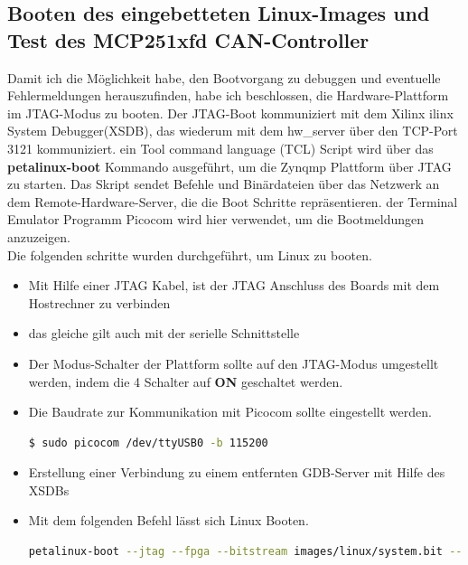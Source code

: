 \subsection{Booten des eingebetteten Linux-Images und Test des MCP251xfd CAN-Controller}
Damit ich die Möglichkeit habe, den Bootvorgang zu debuggen und eventuelle Fehlermeldungen herauszufinden, habe ich beschlossen, die Hardware-Plattform im JTAG-Modus zu booten. Der JTAG-Boot kommuniziert mit dem Xilinx ilinx System Debugger(XSDB), das wiederum mit dem hw_server über den TCP-Port 3121 kommuniziert. ein Tool command language (TCL) Script wird über das \textbf{petalinux-boot} Kommando ausgeführt, um die Zynqmp Plattform über JTAG zu starten. Das Skript sendet Befehle und Binärdateien über das Netzwerk an dem Remote-Hardware-Server, die die Boot Schritte repräsentieren.
der Terminal Emulator Programm Picocom wird hier verwendet, um die Bootmeldungen anzuzeigen. \\
Die folgenden schritte wurden durchgeführt, um Linux zu booten. 
\begin{itemize}
	\item Mit Hilfe einer JTAG Kabel, ist der JTAG Anschluss des Boards mit dem Hostrechner zu verbinden
	\item das gleiche gilt auch mit der serielle Schnittstelle 
	\item Der Modus-Schalter der Plattform sollte auf den JTAG-Modus umgestellt werden, indem die 4 Schalter auf \textbf{ON} geschaltet werden.
	\item Die Baudrate zur Kommunikation mit Picocom sollte eingestellt werden. 
	\begin{lstlisting}[language=bash]
		$ sudo picocom /dev/ttyUSB0 -b 115200
	\end{lstlisting}
	\item Erstellung einer Verbindung zu einem entfernten GDB-Server mit Hilfe des XSDBs
	\item Mit dem folgenden Befehl lässt sich Linux Booten.
	\begin{lstlisting}[language=bash]
	petalinux-boot --jtag --fpga --bitstream images/linux/system.bit --kernel
	\end{lstlisting}
\end{itemize}

